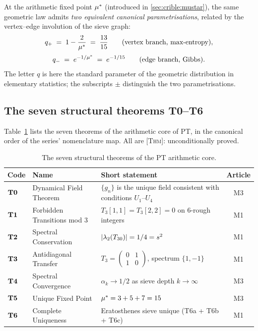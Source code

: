 At the arithmetic fixed point $\mu^{*}$ (introduced in \ref{sec:crible:mustar}), the same geometric law admits \emph{two equivalent canonical parametrisations}, related by the vertex--edge involution of the sieve graph:
\begin{equation}
q_{+} \;=\; 1 - \dfrac{2}{\mu^{*}} \;=\; \dfrac{13}{15}
\qquad\text{(vertex branch, max-entropy)},
\label{eq:qplus_en}
\end{equation}
\begin{equation}
q_{-} \;=\; e^{-1/\mu^{*}} \;=\; e^{-1/15}
\qquad\text{(edge branch, Gibbs)}.
\label{eq:qminus_en}
\end{equation}
The letter $q$ is here the standard parameter of the geometric distribution in elementary statistics; the subscripts $\pm$ distinguish the two parametrisations.

\subsection{The seven structural theorems T0--T6}
\label{sec:crible:Tn}

Table~\ref{tab:Tn_en} lists the seven theorems of the arithmetic core of PT, in the canonical order of the series' nomenclature map. All are \textsc{[Thm]}: unconditionally proved.

\begin{table}[htbp]
\centering
\small
\begin{tabular}{@{}lp{5cm}p{5cm}c@{}}
\toprule
Code & Name & Short statement & Article \\
\midrule
$\textbf{T0}$ & Dynamical Field Theorem & $\{g_n\}$ is the unique field consistent with conditions $U_1$--$U_4$ & M3 \\
$\textbf{T1}$ & Forbidden Transitions mod 3 & $T_3[1,1] = T_3[2,2] = 0$ on 6-rough integers & M1 \\
$\textbf{T2}$ & Spectral Conservation & $|\lambda_2(T_{30})| = 1/4 = s^{2}$ & M1 \\
$\textbf{T3}$ & Antidiagonal Transfer & $T_3 = \begin{pmatrix} 0 & 1 \\ 1 & 0 \end{pmatrix}$, spectrum $\{1,-1\}$ & M1 \\
$\textbf{T4}$ & Spectral Convergence & $\alpha_k \to 1/2$ as sieve depth $k \to \infty$ & M3 \\
$\textbf{T5}$ & Unique Fixed Point & $\mu^{*} = 3 + 5 + 7 = 15$ & M3 \\
$\textbf{T6}$ & Complete Uniqueness & Eratosthenes sieve unique (T6a + T6b + T6c) & M1 \\
\bottomrule
\end{tabular}
\caption{The seven structural theorems of the PT arithmetic core.}
\label{tab:Tn_en}
\end{table}

